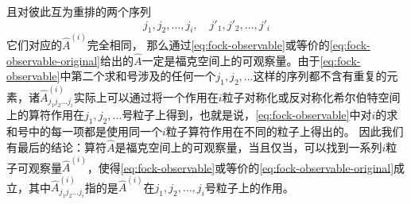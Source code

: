 \documentclass[hyperref, UTF8, a4paper]{ctexart}
\begin{document}
且对彼此互为重排的两个序列
\[
    j_1, j_2, \ldots, j_i, \quad j'_1, j'_2, \ldots, j'_i
\]
它们对应的$\hat{A}^{(i)}$完全相同，
那么通过\eqref{eq:fock-observable}或等价的\eqref{eq:fock-observable-original}给出的$\hat{A}$一定是福克空间上的可观察量。由于\eqref{eq:fock-observable}中第二个求和号涉及的任何一个$j_1, j_2, \ldots$这样的序列都不含有重复的元素，诸$\hat{A}^{(i)}_{j_1 j_2 \ldots j_i}$实际上可以通过将一个作用在$i$粒子对称化或反对称化希尔伯特空间上的算符作用在$j_1, j_2, \ldots$号粒子上得到，也就是说，\eqref{eq:fock-observable}中对$i$的求和号中的每一项都是使用同一个$i$粒子算符作用在不同的粒子上得出的。
因此我们有最后的结论：算符$\hat{A}$是福克空间上的可观察量，当且仅当，可以找到一系列$i$粒子可观察量$\hat{A}^{(i)}$，使得\eqref{eq:fock-observable}或等价的\eqref{eq:fock-observable-original}成立，其中$\hat{A}^{(i)}_{j_1 j_2 \ldots j_i}$指的是$\hat{A}^{(i)}$在$j_1, j_2, \ldots, j_i$号粒子上的作用。
\end{document}
